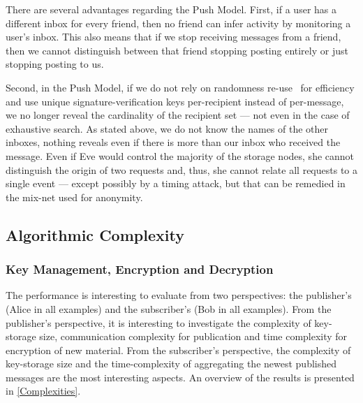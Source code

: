 There are several advantages regarding the Push Model.
First, if a user has a different inbox for every friend, then no friend can 
infer activity by monitoring a user's inbox.
This also means that if we stop receiving messages from a friend, then we 
cannot distinguish between that friend stopping posting entirely or just 
stopping posting to us.

Second, in the Push Model, if we do not rely on randomness 
re-use~\cite{RandomnessReuse} for efficiency and use unique 
signature-verification keys per-recipient instead of per-message, we no longer 
reveal the cardinality of the recipient set --- not even in the case of 
exhaustive search.
As stated above, we do not know the names of the other inboxes, nothing reveals 
even if there is more than our inbox who received the message.
Even if Eve would control the majority of the storage nodes, she cannot 
distinguish the origin of two requests and, thus, she cannot relate all 
requests to a single event --- except possibly by a timing attack, but that can 
be remedied in the mix-net used for anonymity.

\subsection[Complexity]{Algorithmic Complexity}\label{AlgComplexity}

\subsubsection{Key Management, Encryption and Decryption}

The performance is interesting to evaluate from two perspectives: the 
publisher's (Alice in all examples) and the subscriber's (Bob in all examples).
From the publisher's perspective, it is interesting to investigate the 
complexity of key-storage size, communication complexity for publication and 
time complexity for encryption of new material.
From the subscriber's perspective, the complexity of key-storage size and the 
time-complexity of aggregating the newest published messages are the most 
interesting aspects.
An overview of the results is presented in \cref{Complexities}.

